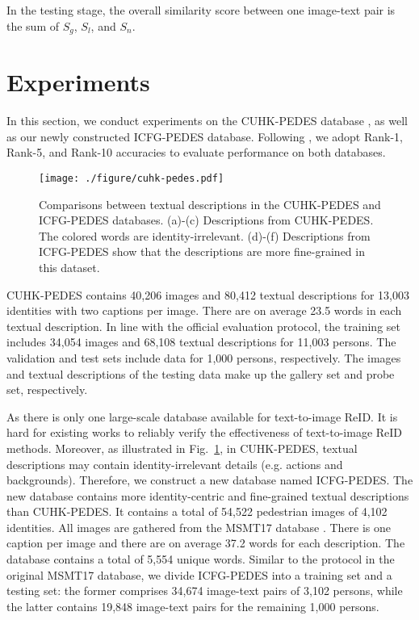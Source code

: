 \documentclass[journal]{IEEEtran}
\begin{document}
In the testing stage, the overall similarity score between one image-text pair is the sum of $S_g$, $S_l$, and $S_n$.


\section{Experiments}\label{Experiments}
In this section, we conduct experiments on the CUHK-PEDES database \cite{li2017person}, as well as our newly constructed ICFG-PEDES database.
Following \cite{li2017person}, we adopt Rank-1, Rank-5, and Rank-10 accuracies to evaluate performance on both databases.

\begin{figure}[t]
\begin{center}
\texttt{[image: ./figure/cuhk-pedes.pdf]}
\end{center}
   \caption{Comparisons between textual descriptions in the CUHK-PEDES and ICFG-PEDES databases. (a)-(c) Descriptions from CUHK-PEDES. The colored words are identity-irrelevant. (d)-(f) Descriptions from ICFG-PEDES show that the descriptions are more fine-grained in this dataset.}
\label{fig:cuhk-pedes}
\end{figure}

CUHK-PEDES contains 40,206 images and 80,412 textual descriptions for 13,003 identities with two captions per image. There are on average 23.5 words in each textual description. In line with the official evaluation protocol, the training set includes 34,054 images and 68,108 textual descriptions for 11,003 persons. The validation and test sets include data for 1,000 persons, respectively. The images and textual descriptions of the testing data make up the gallery set and probe set, respectively.

As there is only one large-scale database available for text-to-image ReID. It is hard for existing works to reliably verify the effectiveness of text-to-image ReID methods. Moreover, as illustrated in Fig.~\ref{fig:cuhk-pedes}, in CUHK-PEDES, textual descriptions may contain identity-irrelevant details (e.g. actions and backgrounds). Therefore, we construct a new database named ICFG-PEDES. The new database contains more identity-centric and fine-grained textual descriptions than CUHK-PEDES. It contains a total of 54,522 pedestrian images of 4,102 identities. All images are gathered from the MSMT17 database \cite{wei2018person}. There is one caption per image and there are on average 37.2 words for each description. The database contains a total of 5,554 unique words. Similar to the protocol in the original MSMT17 database, we divide ICFG-PEDES into a training set and a testing set: the former comprises 34,674 image-text pairs of 3,102 persons, while the latter contains 19,848 image-text pairs for the remaining 1,000 persons.
\end{document}
